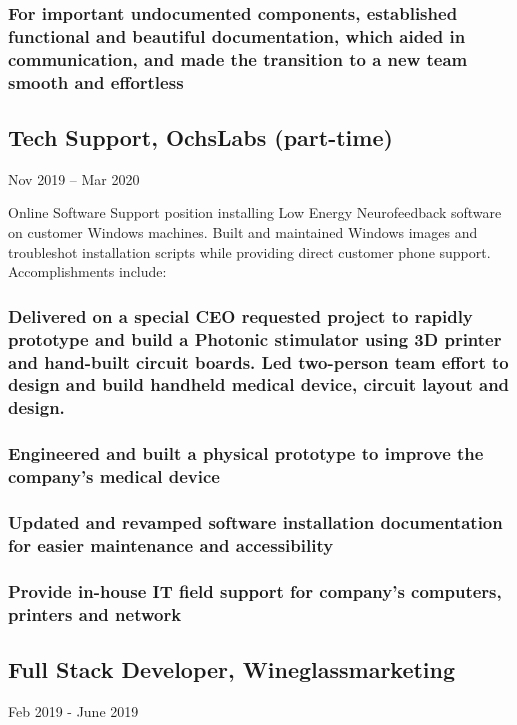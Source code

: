 \documentclass{article}
\begin{document}
        \subsubsection{For important undocumented components, established functional and beautiful documentation, which aided in communication, and made the transition to a new team smooth and effortless}

	 
    \subsection{Tech Support, OchsLabs (part-time)} Nov 2019 – Mar 2020
	    
	    \vspace{0mm}
    	Online Software Support position installing Low Energy Neurofeedback software on customer Windows machines. Built and maintained Windows images and troubleshot installation scripts while providing direct customer phone support. Accomplishments include:

        \vspace{-2mm}
        \subsubsection{Delivered on a special CEO requested project to rapidly prototype and build a Photonic stimulator using 3D printer and hand-built circuit boards. Led two-person team effort to design and build handheld medical device, circuit layout and design.}
    	\subsubsection{Engineered and built a physical prototype to improve the company's medical device}
		\subsubsection{Updated and revamped software installation documentation for easier maintenance and accessibility}
    	\subsubsection{Provide in-house IT field support for company’s computers, printers and network}

    \subsection{Full Stack Developer, Wineglassmarketing} Feb 2019 - June 2019
            
\end{document}
